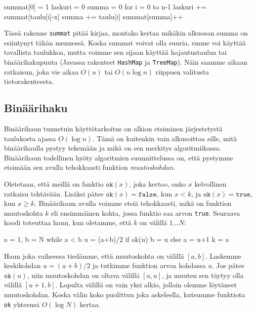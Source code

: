 \begin{code}
summat[0] = 1
laskuri = 0
summa = 0
for i = 0 to n-1
    laskuri += summat[taulu[i]-x]
    summa += taulu[i]
    summat[summa]++
\end{code}

Tässä rakenne \texttt{summat} pitää kirjaa,
montako kertaa mikäkin alkuosan summa on esiintynyt tähän mennessä.
Koska summat voivat olla suuria, emme voi käyttää tavallista taulukkoa,
mutta voimme sen sijaan käyttää hajautustaulua tai binäärihakupuuta
(Javassa rakenteet \texttt{HashMap} ja \texttt{TreeMap}).
Näin saamme aikaan ratkaisun, joka vie aikaa $O(n)$ tai $O(n \log n)$
riippuen valitusta tietorakenteesta.

\subsection{Binäärihaku}

Binäärihaun tunnetuin käyttötarkoitus on alkion etsiminen
järjestetystä taulukosta ajassa $O(\log n)$.
Tämä on kuitenkin vain alkusoittoa sille,
mitä binää\-rihaulla pystyy tekemään ja mikä on sen
merkitys algoritmiikassa.
Binääri\-haun todellinen hyöty algoritmien suunnittelussa on,
että pystymme etsimään sen avulla tehokkaasti funktion \emph{muutoskohdan}.

Oletetaan, että meillä on funktio $\texttt{ok}(x)$,
joka kertoo, onko $x$ kelvollinen ratkaisu tehtävään.
Lisäksi pätee $\texttt{ok}(x)=\texttt{false}$, kun $x<k$,
ja $\texttt{ok}(x)=\texttt{true}$, kun $x \ge k$.
Binäärihaun avulla voimme etsiä tehokkaasti,
mikä on funktion muutoskohta $k$
eli ensimmäinen kohta, jossa funktio saa arvon \texttt{true}.
Seuraava koodi toteuttaa haun, kun oletamme, että $k$ on välillä $1 \dots N$:

\begin{code}
a = 1, b = N
while a < b
    u = (a+b)/2
    if ok(u)
        b = u
    else
        a = u+1
k = a
\end{code}

Haun joka vaiheessa tiedämme, että muutoskohta on välillä $[a,b]$.
Laskemme keskikohdan $u=(a+b)/2$ ja tutkimme funktion arvoa kohdassa $u$.
Jos pätee $\texttt{ok}(u)$, niin muutoskohdan on oltava välillä $[a,u]$,
ja muuten sen täytyy olla välillä $[u+1,b]$.
Lopulta välillä on vain yksi alkio, jolloin olemme löytäneet muutoskohdan.
Koska välin koko puolittuu joka askeleella,
kutsumme funktiota \texttt{ok} yhteensä $O(\log N)$ kertaa.

